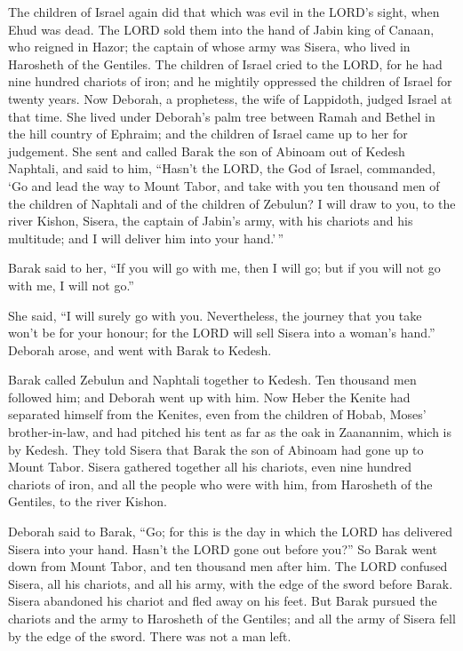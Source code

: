  The children of Israel again did that which was evil in the
LORD's sight, when Ehud was dead.  The LORD sold them into
the hand of Jabin king of Canaan, who reigned in Hazor; the captain of
whose army was Sisera, who lived in Harosheth of the Gentiles.
 The children of Israel cried to the LORD, for he had nine
hundred chariots of iron; and he mightily oppressed the children of
Israel for twenty years.  Now Deborah, a prophetess, the
wife of Lappidoth, judged Israel at that time.  She lived
under Deborah's palm tree between Ramah and Bethel in the hill country
of Ephraim; and the children of Israel came up to her for judgement.
 She sent and called Barak the son of Abinoam out of Kedesh
Naphtali, and said to him, ``Hasn't the LORD, the God of Israel,
commanded, `Go and lead the way to Mount Tabor, and take with you ten
thousand men of the children of Naphtali and of the children of Zebulun?
 I will draw to you, to the river Kishon, Sisera, the
captain of Jabin's army, with his chariots and his multitude; and I will
deliver him into your hand.'\,''

 Barak said to her, ``If you will go with me, then I will
go; but if you will not go with me, I will not go.''

 She said, ``I will surely go with you. Nevertheless, the
journey that you take won't be for your honour; for the LORD will sell
Sisera into a woman's hand.'' Deborah arose, and went with Barak to
Kedesh.

 Barak called Zebulun and Naphtali together to Kedesh. Ten
thousand men followed him; and Deborah went up with him. 
Now Heber the Kenite had separated himself from the Kenites, even from
the children of Hobab, Moses' brother-in-law, and had pitched his tent
as far as the oak in Zaanannim, which is by Kedesh.  They
told Sisera that Barak the son of Abinoam had gone up to Mount Tabor.
 Sisera gathered together all his chariots, even nine
hundred chariots of iron, and all the people who were with him, from
Harosheth of the Gentiles, to the river Kishon.

 Deborah said to Barak, ``Go; for this is the day in which
the LORD has delivered Sisera into your hand. Hasn't the LORD gone out
before you?'' So Barak went down from Mount Tabor, and ten thousand men
after him.  The LORD confused Sisera, all his chariots, and
all his army, with the edge of the sword before Barak. Sisera abandoned
his chariot and fled away on his feet.  But Barak pursued
the chariots and the army to Harosheth of the Gentiles; and all the army
of Sisera fell by the edge of the sword. There was not a man left.

